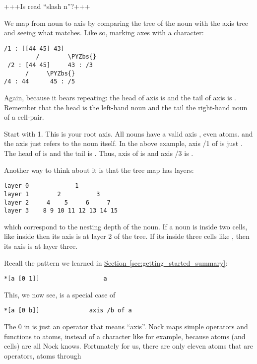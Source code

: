 +++Is  read ``slash n''?+++

We map from noun to axis by comparing the tree of the noun with the axis tree
and seeing what matches. Like so, marking axes with a \kode{/} character:
\begin{framed_shaded}
\begin{Verbatim}[fontsize=\relsize{-2.5},commandchars=\\\{\}]
  /1 : [[44 45] 43]
         /        \PYZbs{}
 /2 : [44 45]     43 : /3
      /     \PYZbs{}
/4 : 44      45 : /5
\end{Verbatim}
\end{framed_shaded}
Again, because it bears repeating: the head of axis  is  and the tail
of axis  is . Remember that the head is the left-hand noun and the
tail the right-hand noun of a cell-pair.

Start with 1. This is your root axis. All nouns have a valid axis , even
atoms. and the axis  just refers to the noun itself. In the above example,
axis /1 of \kode{[[44 45] 43]} is just \kode{[[44 45] 43]}. The head of \kode{[[44 45] 43]} is
\kode{[44 45]} and the tail is . Thus, axis  of \kode{[[44 45] 43]} is \kode{[44 45]}
and axis /3 is .

Another way to think about it is that the tree map has layers:
\begin{framed_shaded}
\begin{Verbatim}[fontsize=\relsize{-2.5},commandchars=\\\{\}]
layer 0             1
layer 1        2          3
layer 2     4    5     6     7
layer 3    8 9 10 11 12 13 14 15
\end{Verbatim}
\end{framed_shaded}
which correspond to the nesting depth of the noun. If a noun is inside two
cells, like  inside \kode{[[[48 49] 45] [46 47]]} then its axis is at layer 2 of
the tree. If its inside three cells like , then its axis is at layer
three.

Recall the pattern we learned in \hyperref[sec:getting_started_summary]{Section~\ref{sec:getting_started_summary}}:
\begin{framed_shaded}
\begin{Verbatim}[fontsize=\relsize{-2.5},commandchars=\\\{\}]
*[a [0 1]]                  a
\end{Verbatim}
\end{framed_shaded}
This, we now see, is a special case of
\begin{framed_shaded}
\begin{Verbatim}[fontsize=\relsize{-2.5},commandchars=\\\{\}]
*[a [0 b]]              axis /b of a
\end{Verbatim}
\end{framed_shaded}
The 0 in \kode{*[a [0 b]]} is just an operator that means ``axis''. Nock maps simple
operators and functions to atoms, instead of a character like \kode{/} for example,
because atoms (and cells) are all Nock knows. Fortunately for us,
there are only eleven atoms that are operators, atoms  through 

